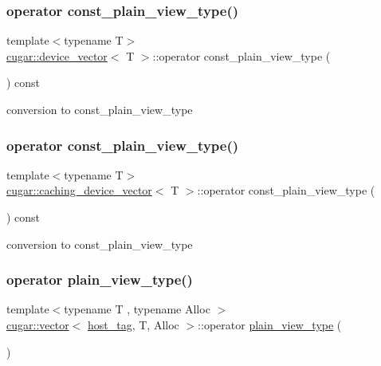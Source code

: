 \subsubsection{\texorpdfstring{operator const\+\_\+plain\+\_\+view\+\_\+type()}{operator const\_plain\_view\_type()}\hspace{0.1cm}{\footnotesize\ttfamily [4/5]}}
{\footnotesize\ttfamily template$<$typename T$>$ \\
\hyperlink{structcugar_1_1device__vector}{cugar\+::device\+\_\+vector}$<$ T $>$\+::operator const\+\_\+plain\+\_\+view\+\_\+type (\begin{DoxyParamCaption}{ }\end{DoxyParamCaption}) const\hspace{0.3cm}{\ttfamily [inline]}}

conversion to const\+\_\+plain\+\_\+view\+\_\+type \mbox{\label{group___basic_gacf7a82dbc75f3ff33d4cb3bc1cae2e2f}} 
\subsubsection{\texorpdfstring{operator const\+\_\+plain\+\_\+view\+\_\+type()}{operator const\_plain\_view\_type()}\hspace{0.1cm}{\footnotesize\ttfamily [5/5]}}
{\footnotesize\ttfamily template$<$typename T$>$ \\
\hyperlink{structcugar_1_1caching__device__vector}{cugar\+::caching\+\_\+device\+\_\+vector}$<$ T $>$\+::operator const\+\_\+plain\+\_\+view\+\_\+type (\begin{DoxyParamCaption}{ }\end{DoxyParamCaption}) const\hspace{0.3cm}{\ttfamily [inline]}}

conversion to const\+\_\+plain\+\_\+view\+\_\+type \mbox{\label{group___basic_gae0a95fb635c4cf188b029a0dd5ca670e}} 
\subsubsection{\texorpdfstring{operator plain\+\_\+view\+\_\+type()}{operator plain\_view\_type()}\hspace{0.1cm}{\footnotesize\ttfamily [1/5]}}
{\footnotesize\ttfamily template$<$typename T , typename Alloc $>$ \\
\hyperlink{structcugar_1_1vector}{cugar\+::vector}$<$ \hyperlink{structcugar_1_1host__tag}{host\+\_\+tag}, T, Alloc $>$\+::operator \hyperlink{structcugar_1_1vector__view}{plain\+\_\+view\+\_\+type} (\begin{DoxyParamCaption}{ }\end{DoxyParamCaption})\hspace{0.3cm}{\ttfamily [inline]}}

